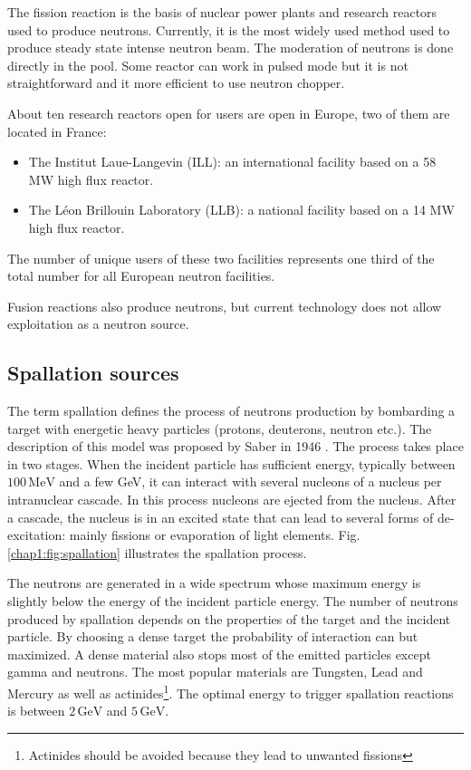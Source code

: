 \begin{refsection}
  The fission reaction is the basis of nuclear power plants and research reactors used to produce neutrons.
  Currently, it is the most widely used method used to produce steady state intense neutron beam. The moderation of neutrons is done directly in the pool.
  Some reactor can work in pulsed mode but it is not straightforward and it more efficient to use neutron chopper.

  About ten research reactors open for users are open in Europe, two of them are located in France:
  \begin{itemize}
    \item The Institut Laue-Langevin (ILL): an international facility based on a 58 MW high flux reactor.
    \item The Léon Brillouin Laboratory (LLB): a national facility based on a 14 MW high flux reactor.
  \end{itemize}
  The number of unique users of these two facilities represents one third of the total number for all European neutron facilities.

  Fusion reactions also produce neutrons, but current technology does not allow exploitation as a neutron source.

  \subsection{Spallation sources}
  The term spallation defines the process of neutrons production by bombarding a target with energetic heavy particles (protons, deuterons, neutron etc.). The description of this model was proposed by Saber in 1946 \cite{PhysRev.72.1114}. The process takes place in two stages. When the incident particle has sufficient energy, typically between $100\,\mathrm{MeV}$ and a few GeV, it can interact with several nucleons of a nucleus per intranuclear cascade. In this process nucleons are ejected from the nucleus. After a cascade, the nucleus is in an excited state that can lead to several forms of de-excitation: mainly fissions or evaporation of light elements. Fig. \ref{chap1:fig:spallation} illustrates the spallation process.

  

  The neutrons are generated in a wide spectrum whose maximum energy is slightly below the energy of the incident particle energy. The number of neutrons produced by spallation depends on the properties of the target and the incident particle. By choosing a dense target the probability of interaction can but maximized. A dense material also stops most of the emitted particles except gamma and neutrons. The most popular materials are Tungsten, Lead and Mercury as well as actinides\footnote{Actinides should be avoided because they lead to unwanted fissions}. The optimal energy to trigger spallation reactions is between $2\,\mathrm{GeV}$ and $5\,\mathrm{GeV}$.


\end{refsection}
